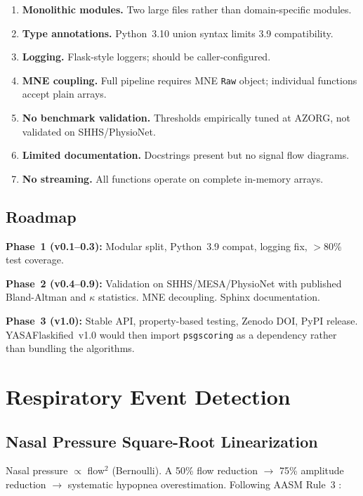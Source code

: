 \documentclass[11pt,a4paper,twocolumn]{article}
\begin{document}
\begin{enumerate}[nosep,leftmargin=1.5em]
  \item \textbf{Monolithic modules.} Two large files rather than domain-specific modules.
  \item \textbf{Type annotations.} Python~3.10 union syntax limits 3.9 compatibility.
  \item \textbf{Logging.} Flask-style loggers; should be caller-configured.
  \item \textbf{MNE coupling.} Full pipeline requires MNE \texttt{Raw} object; individual functions accept plain arrays.
  \item \textbf{No benchmark validation.} Thresholds empirically tuned at AZORG, not validated on SHHS/PhysioNet.
  \item \textbf{Limited documentation.} Docstrings present but no signal flow diagrams.
  \item \textbf{No streaming.} All functions operate on complete in-memory arrays.
\end{enumerate}

\subsection{Roadmap}

\textbf{Phase~1 (v0.1--0.3):} Modular split, Python~3.9 compat, logging fix, $>$80\% test coverage.

\textbf{Phase~2 (v0.4--0.9):} Validation on SHHS/MESA/PhysioNet with published Bland-Altman and $\kappa$ statistics. MNE decoupling. Sphinx documentation.

\textbf{Phase~3 (v1.0):} Stable API, property-based testing, Zenodo DOI, PyPI release. YASAFlaskified~v1.0 would then import \texttt{psgscoring} as a dependency rather than bundling the algorithms.


\section{Respiratory Event Detection}

\subsection{Nasal Pressure Square-Root Linearization}

Nasal pressure $\propto$ flow$^2$ (Bernoulli). A 50\% flow reduction $\to$ 75\% amplitude reduction $\to$ systematic hypopnea overestimation. Following AASM Rule~3 \cite{berry2012}:
\end{document}
